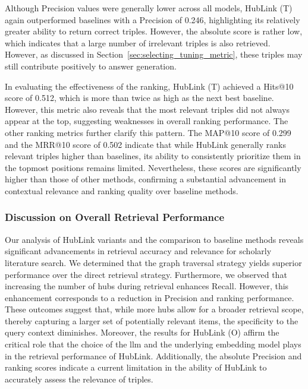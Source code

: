 Although Precision values were generally lower across all models, HubLink (T) again outperformed baselines with a Precision of 0.246, highlighting its relatively greater ability to return correct triples. However, the absolute score is rather low, which indicates that a large number of irrelevant triples is also retrieved. However, as discussed in Section~\ref{sec:selecting_tuning_metric}, these triples may still contribute positively to answer generation.

In evaluating the effectiveness of the ranking, HubLink (T) achieved a Hits@10 score of 0.512, which is more than twice as high as the next best baseline. However, this metric also reveals that the most relevant triples did not always appear at the top, suggesting weaknesses in overall ranking performance. The other ranking metrics further clarify this pattern. The MAP@10 score of 0.299 and the MRR@10 score of 0.502 indicate that while HubLink generally ranks relevant triples higher than baselines, its ability to consistently prioritize them in the topmost positions remains limited. Nevertheless, these scores are significantly higher than those of other methods, confirming a substantial advancement in contextual relevance and ranking quality over baseline methods.



\subsubsection{Discussion on Overall Retrieval Performance}

Our analysis of HubLink variants and the comparison to baseline methods reveals significant advancements in retrieval accuracy and relevance for scholarly literature search. We determined that the graph traversal strategy yields superior performance over the direct retrieval strategy. Furthermore, we observed that increasing the number of hubs during retrieval enhances Recall. However, this enhancement corresponds to a reduction in Precision and ranking performance. These outcomes suggest that, while more hubs allow for a broader retrieval scope, thereby capturing a larger set of potentially relevant items, the specificity to the query context diminishes. Moreover, the results for HubLink (O) affirm the critical role that the choice of the \gls{llm} and the underlying embedding model plays in the retrieval performance of HubLink. Additionally, the absolute Precision and ranking scores indicate a current limitation in the ability of HubLink to accurately assess the relevance of triples.

